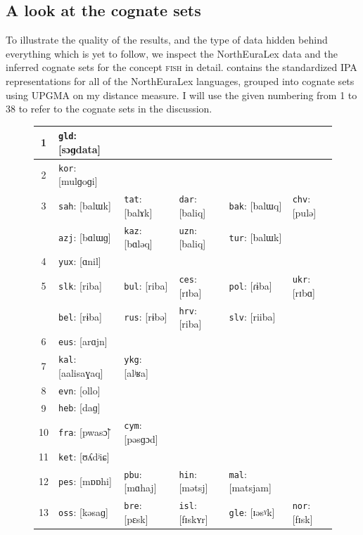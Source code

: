 \subsection{A look at the cognate sets}
To illustrate the quality of the results, and the type of data hidden behind everything which is yet to follow, we inspect the NorthEuraLex data and the inferred cognate sets for the concept \textsc{fish} in detail.  contains the standardized IPA representations for all of the NorthEuraLex languages, grouped into cognate sets using UPGMA on my distance measure. I will use the given numbering from 1 to 38 to refer to the cognate sets in the discussion.

\begin{figure}[p!]
\centering \footnotesize
\begin{tabular}{clllll} \hline
1 & \texttt{gld}: [sɔɡdata] & & & & \\
\hline
2 & \texttt{kor}: [mulɡoɡi] & & & & \\
\hline
3 & \texttt{sah}: [balɯk] & \texttt{tat}: [balɤk] & \texttt{dar}: [baliq] & \texttt{bak}: [balɯq] & \texttt{chv}: [pulə]\\
& \texttt{azj}: [bɑlɯɡ] & \texttt{kaz}: [bɑləq] & \texttt{uzn}: [baliq] & \texttt{tur}: [balɯk] & \\
\hline
4 & \texttt{yux}: [ɑnil] & & & & \\
\hline
5 & \texttt{slk}: [riba] & \texttt{bul}: [riba] & \texttt{ces}: [rɪba] & \texttt{pol}: [ɾɨba] & \texttt{ukr}: [rɪbɑ]\\
& \texttt{bel}: [rɨba] & \texttt{rus}: [rɨbə] & \texttt{hrv}: [riba] & \texttt{slv}: [riiba] & \\
\hline
6 & \texttt{eus}: [arɑjn] & & & & \\
\hline
7 & \texttt{kal}: [aalisaɣaq] & \texttt{ykg}: [alʲʁa] & & & \\
\hline
8 & \texttt{evn}: [ollo] & & & &\\
\hline
9 & \texttt{heb}: [daɡ] & & & &\\
\hline
10 & \texttt{fra}: [pwasɔ̃] & \texttt{cym}: [pəsɡɔd] & & &\\
\hline
11 & \texttt{ket}: [ʊʎdʲiɕ] & & & &\\
\hline
12 & \texttt{pes}: [mɒɒhi] & \texttt{pbu}: [mɑhaj] & \texttt{hin}: [mətsj] & \texttt{mal}: [matsjam] & \\
\hline
13 & \texttt{oss}: [kəsaɡ] & \texttt{bre}: [pɛsk] & \texttt{isl}: [fɪskʏr] & \texttt{gle}: [ɪəsˠk] & \texttt{nor}: [fɪsk]\\

\end{tabular}
\end{figure}
